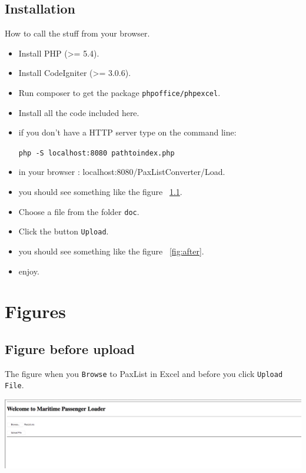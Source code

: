 \documentclass[a4paper, 11pt]{article}
\begin{document}
\subsection{Installation}
How to call the stuff from your browser.
\begin{itemize}
\item Install PHP (\textgreater= 5.4).
\item Install CodeIgniter (\textgreater = 3.0.6).
\item Run composer to get the package \texttt{phpoffice/phpexcel}.
\item Install all the code included here.
\item if you don't have a HTTP server type on the command line:

\texttt{php -S localhost:8080 path\textunderscore to\textunderscore  index.php}
\item in your browser : localhost:8080/PaxListConverter/Load.
\item you should see something like the figure ~\ref{fig:before}.
\item Choose a file from the folder \texttt{doc}.
\item Click the button \texttt{Upload}.
\item you should see something like the figure ~\ref{fig:after}.
\item enjoy.
\end{itemize}
\section{Figures}
\subsection{Figure before upload}
\label{fig:before}
The figure when you \texttt{Browse} to PaxList in Excel and before you click \texttt{Upload File}.

\includegraphics{figures/before}
\end{document}
